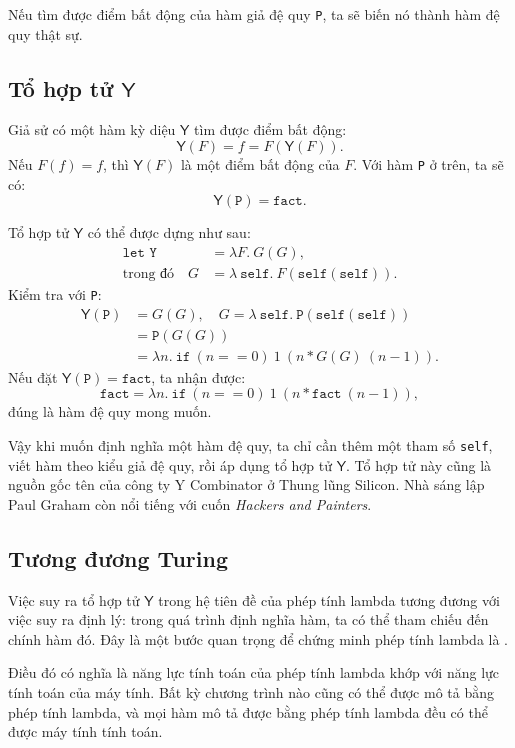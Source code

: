 \documentclass[11pt]{article}
\newcommand{\Ycomb}{\mathsf{Y}}
\begin{document}
Nếu tìm được điểm bất động của hàm giả đệ quy \texttt{P}, ta sẽ biến nó thành
hàm đệ quy thật sự.

\subsection{Tổ hợp tử \texorpdfstring{\(\Ycomb\)}{Y}}

Giả sử có một hàm kỳ diệu \(\Ycomb\) tìm được điểm bất động:
\[
  \Ycomb(F) = f = F(\Ycomb(F)).
\]
Nếu \(F(f)=f\), thì \(\Ycomb(F)\) là một điểm bất động của \(F\). Với hàm
\texttt{P} ở trên, ta sẽ có:
\[
  \Ycomb(\texttt{P}) = \texttt{fact}.
\]

Tổ hợp tử \(\Ycomb\) có thể được dựng như sau:
\[
\begin{aligned}
  \texttt{let Y} &= \lambda F.\ G(G),\\
  \text{trong đó}\quad
  G &= \lambda\ \texttt{self}.\ F(\texttt{self}(\texttt{self})).
\end{aligned}
\]
Kiểm tra với \texttt{P}:
\[
\begin{aligned}
\Ycomb(\texttt{P})
&= G(G),\quad G=\lambda\ \texttt{self}.\ \texttt{P}(\texttt{self}(\texttt{self}))\\
&= \texttt{P}(G(G))\\
&= \lambda n.\ \texttt{if}\ (n==0)\ 1\ (n * G(G)\ (n-1)).
\end{aligned}
\]
Nếu đặt \(\Ycomb(\texttt{P})=\texttt{fact}\), ta nhận được:
\[
  \texttt{fact} =
  \lambda n.\ \texttt{if}\ (n==0)\ 1\ (n * \texttt{fact}\ (n-1)),
\]
đúng là hàm đệ quy mong muốn.

Vậy khi muốn định nghĩa một hàm đệ quy, ta chỉ cần thêm một tham số
\texttt{self}, viết hàm theo kiểu giả đệ quy, rồi áp dụng tổ hợp tử \(\Ycomb\).
Tổ hợp tử này cũng là nguồn gốc tên của công ty Y Combinator ở Thung lũng
Silicon. Nhà sáng lập Paul Graham còn nổi tiếng với cuốn \emph{Hackers and
Painters}.

\subsection{Tương đương Turing}

Việc suy ra tổ hợp tử \(\Ycomb\) trong hệ tiên đề của phép tính lambda tương
đương với việc suy ra định lý: trong quá trình định nghĩa hàm, ta có thể tham
chiếu đến chính hàm đó. Đây là một bước quan trọng để chứng minh phép tính
lambda là .

Điều đó có nghĩa là năng lực tính toán của phép tính lambda khớp với năng lực
tính toán của máy tính. Bất kỳ chương trình nào cũng có thể được mô tả bằng
phép tính lambda, và mọi hàm mô tả được bằng phép tính lambda đều có thể được
máy tính tính toán.
\end{document}
